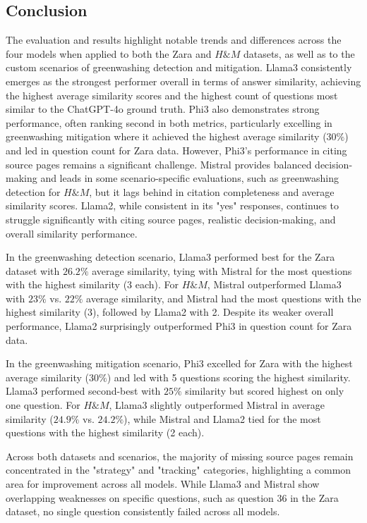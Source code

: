\documentclass[]{article}
\begin{document}
\subsection{Conclusion}
The evaluation and results highlight notable trends and differences across the four models when applied to both the Zara and $H\&M$ datasets, 
as well as to the custom scenarios of greenwashing detection and mitigation.
Llama3 consistently emerges as the strongest performer overall in terms of answer similarity, 
achieving the highest average similarity scores and the highest count of questions most similar to the ChatGPT-4o ground truth.
Phi3 also demonstrates strong performance, often ranking second in both metrics, particularly excelling in greenwashing mitigation where it achieved the highest average similarity ($30\%$) and led in question count for Zara data. 
However, Phi3’s performance in citing source pages remains a significant challenge. Mistral provides balanced decision-making and leads in some scenario-specific evaluations,
such as greenwashing detection for $H\&M$, but it lags behind in citation completeness and average similarity scores. Llama2, while consistent in its "yes" responses, continues to struggle significantly with citing source pages, realistic decision-making, and overall similarity performance.

In the greenwashing detection scenario, Llama3 performed best for the Zara dataset with $26.2\%$ average similarity, tying with Mistral for the most questions with the highest similarity (3 each). For $H\&M$, Mistral outperformed Llama3 with $23\%$ vs. $22\%$ average similarity, 
and Mistral had the most questions with the highest similarity (3), followed by Llama2 with 2. Despite its weaker overall performance, Llama2 surprisingly outperformed Phi3 in question count for Zara data.

In the greenwashing mitigation scenario, Phi3 excelled for Zara with the highest average similarity ($30\%$) and led with 5 questions scoring the highest similarity. Llama3 performed second-best with $25\%$ similarity but scored highest on only one question. 
For $H\&M$, Llama3 slightly outperformed Mistral in average similarity ($24.9\%$ vs. $24.2\%$), while Mistral and Llama2 tied for the most questions with the highest similarity (2 each).

Across both datasets and scenarios, the majority of missing source pages remain concentrated in the "strategy" and "tracking" categories, highlighting a common area for improvement across all models. 
While Llama3 and Mistral show overlapping weaknesses on specific questions, such as question 36 in the Zara dataset, no single question consistently failed across all models.
\end{document}
